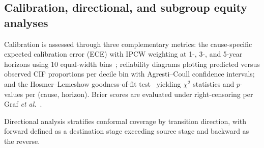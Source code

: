 \documentclass[11pt]{article}
\begin{document}
\subsection*{Calibration, directional, and subgroup equity analyses}

Calibration is assessed through three complementary metrics: the cause-specific expected calibration error (ECE) with IPCW weighting at 1-, 3-, and 5-year horizons using 10 equal-width bins~\cite{naeini2015ece,kumar2019verified}; reliability diagrams plotting predicted versus observed CIF proportions per decile bin with Agresti--Coull confidence intervals; and the Hosmer--Lemeshow goodness-of-fit test~\cite{hosmer2013applied} yielding $\chi^2$ statistics and $p$-values per (cause, horizon). Brier scores are evaluated under right-censoring per Graf \textit{et al.}~\cite{graf1999brier,gerds2006consistent}.

Directional analysis stratifies conformal coverage by transition direction, with forward defined as a destination stage exceeding source stage and backward as the reverse.
\end{document}
